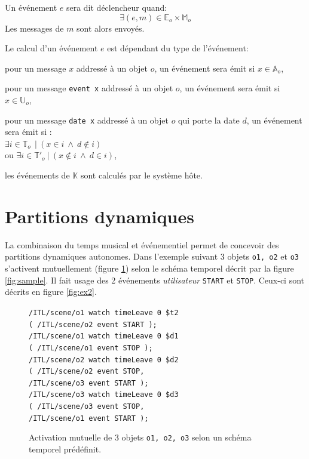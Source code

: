 \documentclass{article}
\newcommand{\OSC}[1]	{{\fontsize{9pt}{9pt} \selectfont\texttt{#1}}}
\newcommand{\tab}{\hspace*{4mm}}
\let\olditemize\itemize
\let\oldenditemize\enditemize
\renewenvironment{itemize} 	{\olditemize \renewcommand{\labelitemi}{$\bullet$} \setlength{\itemsep}{0mm}}{\oldenditemize}
\newcommand{\sample}[1]		{\vspace{-0.2em}\begin{center}\colorbox{mygrey}{\begin{minipage}[t]{0.98\columnwidth} {\small \texttt{#1}}\end{minipage}}\end{center}}
\begin{document}
Un événement $e$ sera dit déclencheur quand:
\[
	\exists (e, m) \in \mathbb{E}_o \times \mathbb{M}_o  
\] 
Les messages de $m$ sont alors envoyés.

Le calcul d'un événement $e$ est dépendant du type de l'événement:
\begin{itemize}
\item[-] pour un message $x$ addressé à un objet $o$, un événement sera émit si $x \in \mathbb{A}_o$, 
\item[-] pour un message \OSC{event x} addressé à un objet $o$, un événement sera émit si $x \in \mathbb{U}_o$,
\item[-] pour un message \OSC{date x} addressé à un objet $o$ qui porte la date $d$, un événement sera émit si :\\ 
\hspace*{3.5mm} $\exists i \in \mathbb{T}_o\ \ |\ (x \in i\ \land\ d \not\in i)$ \\
ou $\exists i \in \mathbb{T'}_o\ |\ (x \not \in i\ \land\ d \in i)$,
\item[-] les événements de $\mathbb{K}$ sont calculés par le système hôte.
\end{itemize}


\section{Partitions dynamiques}

La combinaison du temps musical et événementiel permet de concevoir des partitions dynamiques autonomes. Dans l'exemple suivant 3 objets \OSC{o1, o2} et \OSC{o3} s'activent mutuellement (figure \ref{fig:ex1}) selon le schéma temporel décrit par la figure \ref{fig:sample}. Il fait usage des 2 événements \emph{utilisateur} \OSC{START} et \OSC{STOP}. Ceux-ci sont décrits en figure \ref{fig:ex2}.

\begin{figure}[h]
   \centering
\sample{/ITL/scene/o1 watch timeLeave 0 \$t2 \\
   \tab( /ITL/scene/o2 event START );\\
	/ITL/scene/o1 watch timeLeave 0 \$d1 \\
	\tab( /ITL/scene/o1 event STOP );\\
	/ITL/scene/o2 watch timeLeave 0 \$d2 \\
	\tab( /ITL/scene/o2 event STOP, \\
	\tab \tab/ITL/scene/o3 event START );\\
	/ITL/scene/o3 watch timeLeave 0 \$d3 \\
	\tab( /ITL/scene/o3 event STOP, \\
	\tab \tab/ITL/scene/o1 event START );
}
   \caption{Activation mutuelle de 3 objets \OSC{o1, o2, o3} selon un schéma temporel prédéfinit.}
   \label{fig:ex1}
\end{figure}
\end{document}
